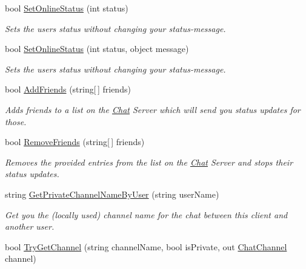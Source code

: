 \begin{DoxyCompactItemize}
bool \hyperlink{class_exit_games_1_1_client_1_1_photon_1_1_chat_1_1_chat_client_af3dade275735d7490a9872e965e6830f}{Set\+Online\+Status} (int status)
\begin{DoxyCompactList}\small\item\em Sets the user\textquotesingle{}s status without changing your status-\/message. \end{DoxyCompactList}\item 
bool \hyperlink{class_exit_games_1_1_client_1_1_photon_1_1_chat_1_1_chat_client_a9ae2d62c65f72f1ebea7b22ca8ce3b91}{Set\+Online\+Status} (int status, object message)
\begin{DoxyCompactList}\small\item\em Sets the user\textquotesingle{}s status without changing your status-\/message. \end{DoxyCompactList}\item 
bool \hyperlink{class_exit_games_1_1_client_1_1_photon_1_1_chat_1_1_chat_client_a66aa30bff5ca81b1a1811d8e36b09546}{Add\+Friends} (string\mbox{[}$\,$\mbox{]} friends)
\begin{DoxyCompactList}\small\item\em Adds friends to a list on the \hyperlink{namespace_exit_games_1_1_client_1_1_photon_1_1_chat}{Chat} Server which will send you status updates for those. \end{DoxyCompactList}\item 
bool \hyperlink{class_exit_games_1_1_client_1_1_photon_1_1_chat_1_1_chat_client_a8071d5a27bc1828fdcb19deee57deac2}{Remove\+Friends} (string\mbox{[}$\,$\mbox{]} friends)
\begin{DoxyCompactList}\small\item\em Removes the provided entries from the list on the \hyperlink{namespace_exit_games_1_1_client_1_1_photon_1_1_chat}{Chat} Server and stops their status updates. \end{DoxyCompactList}\item 
string \hyperlink{class_exit_games_1_1_client_1_1_photon_1_1_chat_1_1_chat_client_a24f6e608fc1b838de8de908c6756571f}{Get\+Private\+Channel\+Name\+By\+User} (string user\+Name)
\begin{DoxyCompactList}\small\item\em Get you the (locally used) channel name for the chat between this client and another user. \end{DoxyCompactList}\item 
bool \hyperlink{class_exit_games_1_1_client_1_1_photon_1_1_chat_1_1_chat_client_a518706086a60688c5dbe946e3b437491}{Try\+Get\+Channel} (string channel\+Name, bool is\+Private, out \hyperlink{class_exit_games_1_1_client_1_1_photon_1_1_chat_1_1_chat_channel}{Chat\+Channel} channel)

\end{DoxyCompactItemize}
